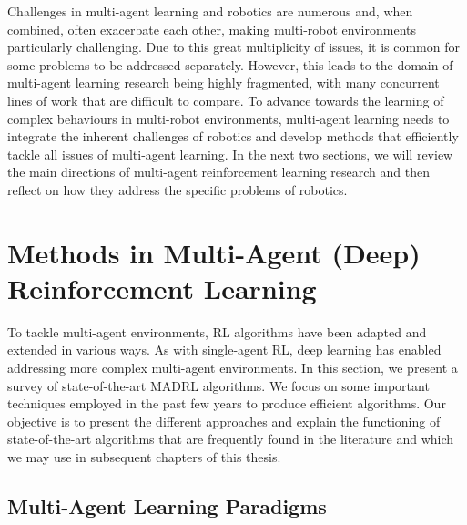 \noindent
Challenges in multi-agent learning and robotics are numerous and, when combined, often exacerbate each other, making multi-robot environments particularly challenging. Due to this great multiplicity of issues, it is common for some problems to be addressed separately. However, this leads to the domain of multi-agent learning research being highly fragmented, with many concurrent lines of work that are difficult to compare. To advance towards the learning of complex behaviours in multi-robot environments, multi-agent learning needs to integrate the inherent challenges of robotics and develop methods that efficiently tackle all issues of multi-agent learning. In the next two sections, we will review the main directions of multi-agent reinforcement learning research and then reflect on how they address the specific problems of robotics. 











\section{Methods in Multi-Agent (Deep) Reinforcement Learning}\label{sec:MADRL_Review}

To tackle multi-agent environments, RL algorithms have been adapted and extended in various ways. As with single-agent RL, deep learning has enabled addressing more complex multi-agent environments. In this section, we present a survey of state-of-the-art MADRL algorithms. We focus on some important techniques employed in the past few years to produce efficient algorithms. Our objective is to present the different approaches and explain the functioning of state-of-the-art algorithms that are frequently found in the literature and which we may use in subsequent chapters of this thesis.


% 


\subsection{Multi-Agent Learning Paradigms}\label{sec:MAL:Paradigms}


